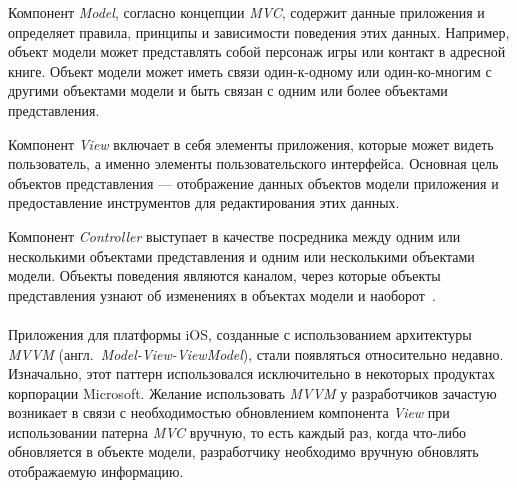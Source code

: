 Компонент \textit{Model}, согласно концепции \textit{MVC}, содержит данные приложения и определяет правила,
принципы и зависимости поведения этих данных. Например, объект модели может
представлять собой персонаж игры или контакт в адресной книге.
Объект модели может иметь связи один-к-одному или один-ко-многим с другими
объектами модели и быть связан с одним или более объектами представления.

Компонент \textit{View} включает в себя элементы приложения,
которые может видеть пользователь, а именно элементы пользовательского интерфейса.
Основная цель объектов представления --- отображение данных объектов модели приложения
и предоставление инструментов для редактирования этих данных.

Компонент \textit{Controller} выступает в качестве посредника между одним или
несколькими объектами представления и одним или несколькими объектами модели.
Объекты поведения являются каналом, через которые объекты представления
узнают об изменениях в объектах модели и наоборот~\cite{mvc_apple_docs}.



\paragraph{}

Приложения для платформы iOS, созданные с использованием архитектуры
\textit{MVVM} (англ.~\textit{Model-View-ViewModel}), стали появляться относительно недавно.
Изначально, этот паттерн использовался
исключительно в некоторых продуктах корпорации Microsoft. Желание использовать
\textit{MVVM} у разработчиков зачастую возникает в связи с необходимостью
обновлением компонента \textit{View} при использовании патерна \textit{MVC} вручную,
то есть каждый раз, когда что-либо обновляется в объекте модели,
разработчику необходимо вручную обновлять отображаемую информацию.

